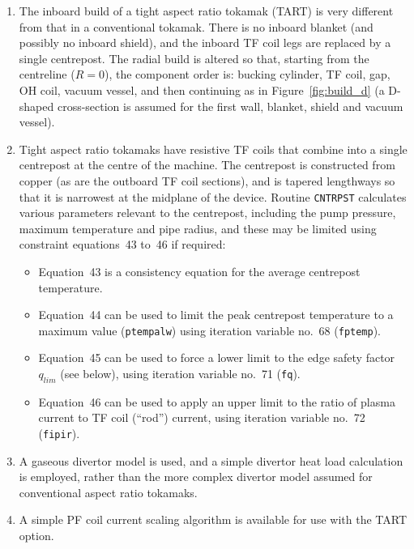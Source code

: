 \documentclass[11pt,a4paper]{report}
\begin{document}
\begin{enumerate}

\item The inboard build of a tight aspect ratio tokamak (TART) is very
  different from that in a conventional tokamak. There is no inboard blanket
  (and possibly no inboard shield), and the inboard TF coil legs are replaced
  by a single centrepost. The radial build is altered so that, starting from
  the centreline ($R = 0$), the component order is: bucking cylinder, TF coil,
  gap, OH coil, vacuum vessel, and then continuing as in Figure~\ref{fig:build_d}
  (a D-shaped cross-section is assumed for the first wall, blanket, shield and
  vacuum vessel).

\item Tight aspect ratio tokamaks have resistive TF coils that combine into a
  single centrepost at the centre of the machine. The centrepost is
  constructed from copper (as are the outboard TF coil sections), and is
  tapered lengthways so that it is narrowest at the midplane of the device.
  Routine \texttt{CNTRPST} calculates various parameters relevant to the
  centrepost, including the pump pressure, maximum temperature and pipe
  radius, and these may be limited using constraint equations~43 to~46 if
  required:

  \begin{itemize}
  \item Equation~43 is a consistency equation for the average centrepost
    temperature.
  \item Equation~44 can be used to limit the peak centrepost temperature to a
    maximum value (\texttt{ptempalw}) using iteration variable no.\ 68
    (\texttt{fptemp}).
  \item Equation~45 can be used to force a lower limit to the edge safety
    factor $q_{lim}$ (see below), using iteration variable no.\ 71 (\texttt{fq}).
  \item Equation~46 can be used to apply an upper limit to the ratio of plasma
    current to TF coil (``rod'') current, using iteration variable no.\ 72
    (\texttt{fipir}).
  \end{itemize}

\item A gaseous divertor model is used, and a simple divertor heat load
  calculation is employed, rather than the more complex divertor model assumed
  for conventional aspect ratio tokamaks.

\item A simple PF coil current scaling algorithm is
  available for use with the TART option.


\end{enumerate}
\end{document}
